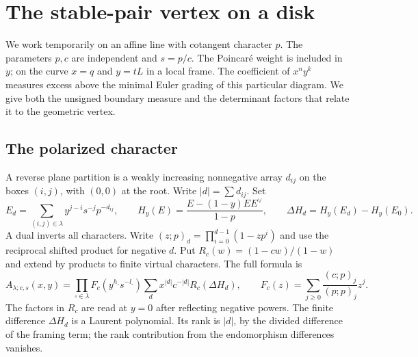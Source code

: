 \section{The stable-pair vertex on a disk}\label{sec:disk}
We work temporarily on an affine line with cotangent character $p$.
The parameters $p,c$ are independent and $s=p/c$. The Poincar\'e
weight is included in $y$; on the curve $x=q$ and $y=tL$ in a
local frame. The coefficient of $x^ny^k$ measures excess above
the minimal Euler grading of this particular diagram. We give both
the unsigned boundary measure and the determinant factors that
relate it to the geometric vertex.
\subsection{The polarized character}


A reverse plane partition is a weakly increasing nonnegative array $d_{ij}$ on the boxes $(i,j)$, with $(0,0)$ at the root. Write $|d|=\sum d_{ij}$. Set
\[
 E_d=\sum_{(i,j)\in\lambda} y^{j-i}s^{-j}p^{-d_{ij}},
 \qquad H_y(E)=\frac{E-(1-y)EE^\vee}{1-p},
 \qquad \Delta H_d=H_y(E_d)-H_y(E_0).
\]
A dual inverts all characters. Write $(z;p)_d=\prod_{i=0}^{d-1}(1-zp^i)$ and use the reciprocal shifted product for negative $d$. Put $R_c(w)=(1-cw)/(1-w)$ and extend by products to finite virtual characters. The full formula is
\[
 A_{\lambda;c,s}(x,y)=
 \prod_{\square\in\lambda} F_c(y^{h_\square}s^{-l_\square})
 \sum_{d} x^{|d|}c^{-|d|} R_c(\Delta H_d),
 \qquad F_c(z)=\sum_{j\ge0}\frac{(c;p)_j}{(p;p)_j}z^j .
\]
The factors in $R_c$ are read at $y=0$ after reflecting negative powers. The finite difference $\Delta H_d$ is a Laurent polynomial. Its rank is $|d|$, by the divided difference of the framing term; the rank contribution from the endomorphism differences vanishes.

